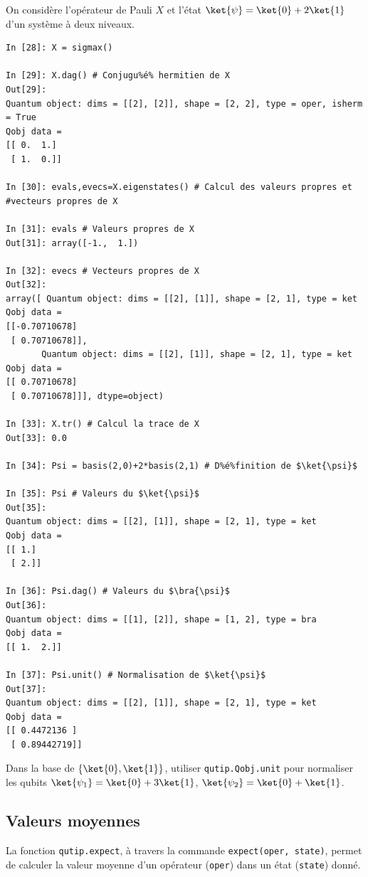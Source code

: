 \begin{example}
On considère l'opérateur de Pauli $X$ et l'état $\ket{\psi}=\ket{0}+2\ket{1}$ 
d'un système à deux niveaux.
\end{example}
\begin{lstlisting}[commentstyle=\scriptsize]
In [28]: X = sigmax()

In [29]: X.dag() # Conjugu%é% hermitien de X
Out[29]: 
Quantum object: dims = [[2], [2]], shape = [2, 2], type = oper, isherm = True
Qobj data =
[[ 0.  1.]
 [ 1.  0.]]

In [30]: evals,evecs=X.eigenstates() # Calcul des valeurs propres et 
#vecteurs propres de X

In [31]: evals # Valeurs propres de X
Out[31]: array([-1.,  1.])

In [32]: evecs # Vecteurs propres de X
Out[32]: 
array([ Quantum object: dims = [[2], [1]], shape = [2, 1], type = ket
Qobj data =
[[-0.70710678]
 [ 0.70710678]],
       Quantum object: dims = [[2], [1]], shape = [2, 1], type = ket
Qobj data =
[[ 0.70710678]
 [ 0.70710678]]], dtype=object)

In [33]: X.tr() # Calcul la trace de X
Out[33]: 0.0

In [34]: Psi = basis(2,0)+2*basis(2,1) # D%é%finition de $\ket{\psi}$

In [35]: Psi # Valeurs du $\ket{\psi}$
Out[35]: 
Quantum object: dims = [[2], [1]], shape = [2, 1], type = ket
Qobj data =
[[ 1.]
 [ 2.]]
 
In [36]: Psi.dag() # Valeurs du $\bra{\psi}$
Out[36]: 
Quantum object: dims = [[1], [2]], shape = [1, 2], type = bra
Qobj data =
[[ 1.  2.]]

In [37]: Psi.unit() # Normalisation de $\ket{\psi}$
Out[37]: 
Quantum object: dims = [[2], [1]], shape = [2, 1], type = ket
Qobj data =
[[ 0.4472136 ]
 [ 0.89442719]]
\end{lstlisting}

\begin{exercise}
Dans la base de $\{\ket{0},\ket{1}\}$, utiliser \texttt{qutip.Qobj.unit} pour
normaliser les qubits $\ket{\psi_1}=\ket{0}+3\ket{1}$, 
$\ket{\psi_2}=\ket{0}+\ket{1}$.
\end{exercise}

\subsection{Valeurs moyennes}

La fonction \texttt{qutip.expect}, à travers la commande \texttt{expect(oper, 
state)}, permet de calculer la valeur moyenne d'un opérateur (\texttt{oper}) 
dans un état (\texttt{state}) donné. 

